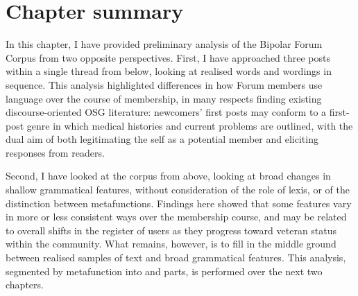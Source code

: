\section{Chapter summary}

In this chapter, I have provided preliminary analysis of the Bipolar Forum Corpus from two opposite perspectives. First, I have approached three \glspl{post} within a single \gls{thread} from below, looking at realised words and wordings in sequence. This analysis highlighted differences in how Forum members use language over the course of membership, in many respects finding existing discourse-oriented \gls{OSG} literature: newcomers' first \glspl{post} may conform to a first\hyp{}\gls{post} genre in which medical histories and current problems are outlined, with the dual aim of both legitimating the self as a potential member and eliciting responses from readers.

Second, I have looked at the corpus from above, looking at broad changes in shallow grammatical features, without consideration of the role of lexis, or of the distinction between metafunctions. Findings here showed that some features vary in more or less consistent ways over the membership course, and may be related to overall shifts in the register of users as they progress toward veteran status within the community. What remains, however, is to fill in the middle ground between realised samples of text and broad grammatical features. This analysis, segmented by metafunction into  and  parts, is performed over the next two chapters.
